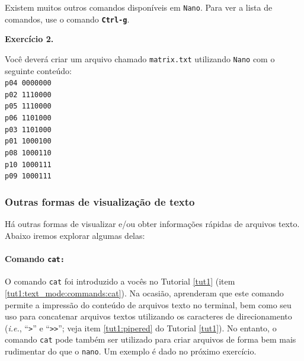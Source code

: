 \begin{refsection}
Existem muitos outros comandos disponíveis em \texttt{Nano}. Para ver a lista de comandos, use o comando \textbf{\texttt{Ctrl-g}}.\\

\begin{blackBlock}{\textbf{Exercício 2.}}\label{tut2:ex:2.\arabic{ex}}

Você deverá criar um arquivo chamado \texttt{matrix.txt} utilizando \texttt{Nano} com o seguinte conteúdo:\\

\texttt{p04 0000000}\\
\texttt{p02 1110000}\\
\texttt{p05 1110000}\\
\texttt{p06 1101000}\\
\texttt{p03 1101000}\\
\texttt{p01 1000100}\\
\texttt{p08 1000110}\\
\texttt{p10 1000111}\\
\texttt{p09 1000111}\\

\end{blackBlock}

\subsubsection{Outras formas de visualização de texto}\label{tut2:text:editors:texttools}

Há outras formas de visualizar e/ou obter informações rápidas de arquivos texto. Abaixo iremos explorar algumas delas:\\
\paragraph{Comando \texttt{cat:}}\label{tut2:text:editors:texttools:cat}
O comando \texttt{cat} foi introduzido a vocês no Tutorial \ref{tut1} (item \ref{tut1:text_mode:commands:cat}). Na ocasião, aprenderam que este comando permite a impressão do conteúdo de arquivos texto no terminal, bem como seu uso para concatenar arquivos textos utilizando os caracteres de direcionamento (\textit{i.e.}, ``\texttt{>}'' e ``\texttt{>>}''; veja item \ref{tut1:pipered} do Tutorial \ref{tut1}). No entanto, o comando \texttt{cat} pode também ser utilizado para criar arquivos de forma bem mais rudimentar do que o \texttt{nano}. Um exemplo é dado no próximo exercício.\\


\end{refsection}
